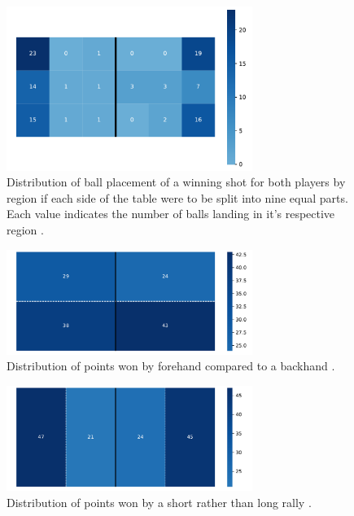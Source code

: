 \begin{figure}[t]
\centering

\includegraphics[width=8cm]{plots/tableheatmaplot.pdf}
\caption{Distribution of ball placement of a winning shot for both players by region if each side of the table were to be split into nine equal parts. Each value indicates the number of balls landing in it's respective region \cite{OSAI}.}

\label{fig:pos}
\end{figure}



\begin{figure}[ht]
\centering

\includegraphics[width=8cm]{plots/forehandvsbackhand.pdf}
\caption{Distribution of points won by forehand compared to a backhand \cite{OSAI}.}

\label{fig:fvbh}
\end{figure}

\begin{figure}[ht]
\centering

\includegraphics[width=8cm]{plots/shortvslongrally.pdf}
\caption{Distribution of points won by a short rather than long rally \cite{OSAI}.}

\label{fig:svlr}
\end{figure}


 
